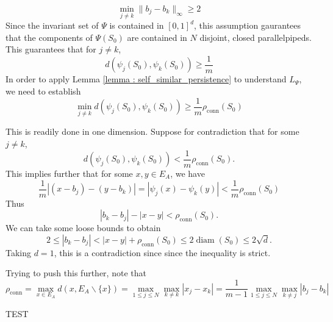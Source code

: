 \documentclass [52pt] {article}
\DeclareMathOperator{\diam}{diam}
\begin{document}
\begin{equation}\label{eq : b_j_spacing}
\min_{j\not= k} \|b_j-b_k\|_\infty \ge 2
\end{equation}
Since the invariant set of $\Psi$ is contained in $[0,1]^d$, this assumption gaurantees that the components of $\Psi(S_0)$ are contained in $N$ disjoint, closed parallelpipeds.  This guarantees that for $j\not= k$, 
\[d(\psi_j(S_0), \psi_k(S_0)) \ge \frac{1}{m}\]
In order to apply Lemma \ref{lemma : self_similar_persistence} to understand $L_\Psi$, we need to establish
\begin{equation}
\min_{j\not= k}d(\psi_j(S_0), \psi_k(S_0)) \ge \frac{1}{m}\rho_{\mathrm{conn}}(S_0)
\end{equation}

This is readily done in one dimension.  Suppose for contradiction that for some $j\not= k$, 
\[d(\psi_j(S_0),\psi_k(S_0))<\frac{1}{m}\rho_{\mathrm{conn}}(S_0).\]
This implies further that for some $x,y\in E_A$, we have 
\[\frac{1}{m}|(x - b_j) - (y-b_k)| = |\psi_j(x)-\psi_k(y)| < \frac{1}{m}\rho_{\mathrm{conn}}(S_0)\]
Thus
\[|b_k-b_j|-|x-y| <\rho_{\mathrm{conn}}(S_0).\]
We can take some loose bounds to obtain
\[2\le|b_k-b_j| <|x-y| + \rho_{\mathrm{conn}}(S_0)\le 2\diam(S_0) \le 2\sqrt{d}.\]
Taking $d = 1$, this is a contradiction since since the inequality is strict.

Trying to push this further, note that 
\[\rho_{\mathrm{conn}} = \max_{x\in E_A}d(x,E_A\backslash\{x\}) = \max_{1\le j\le N}\max_{k\not = k}|x_j-x_k| =\frac{1}{m-1}\max_{1\le j\le N}\max_{k\not= j}|b_j-b_k|\]

TEST
\end{document}
